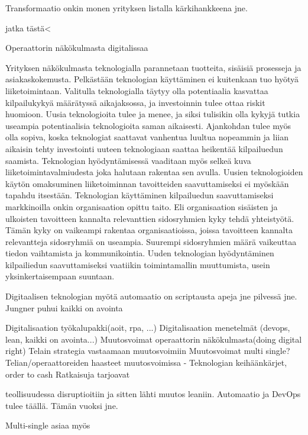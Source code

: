 \documentclass[finnish,12pt,a4paper,pdftex]{article}
\begin{document}
Transformaatio onkin monen yrityksen listalla kärkihankkeena jne.

jatka tästä<


Operaattorin näkökulmasta digitalissaa



Yrityksen näkökulmasta teknologialla parannetaan tuotteita, sisäisiä prosesseja ja asiakaskokemusta. Pelkästään teknologian käyttäminen ei kuitenkaan tuo hyötyä liiketoimintaan. Valitulla teknologialla täytyy olla potentiaalia kasvattaa kilpailukykyä määrätyssä aikajaksossa, ja investoinnin tulee ottaa riskit huomioon. Uusia teknologioita tulee ja menee, ja siksi tulisikin olla kykyjä tutkia useampia potentiaalisia teknologioita saman aikaisesti. Ajankohdan tulee myös olla sopiva, koska teknologiat saattavat vanhentua luultua nopeammin ja liian aikaisin tehty investointi uuteen teknologiaan saattaa heikentää kilpailuedun saamista. Teknologian hyödyntämisessä vaaditaan myös selkeä kuva liiketoimintavalmiudesta joka halutaan rakentaa sen avulla. Uusien teknologioiden käytön omaksuminen liiketoiminnan tavoitteiden saavuttamiseksi ei myöskään tapahdu itsestään. Teknologian käyttäminen kilpailuedun saavuttamiseksi markkinoilla onkin organisaation opittu taito. Eli organisaation sisäisten ja ulkoisten tavoitteen kannalta relevanttien sidosryhmien kyky tehdä yhteistyötä. Tämän kyky on vaikeampi rakentaa organisaatioissa, joissa tavoitteen kannalta relevantteja sidosryhmiä on useampia. Suurempi sidosryhmien määrä vaikeuttaa tiedon vaihtamista ja kommunikointia. Uuden teknologian hyödyntäminen kilpailiedun saavuttamiseksi vaatiikin toimintamallin muuttumista, usein yksinkertaisempaan suuntaan.





Digitaalisen teknologian myötä automaatio on scriptausta apeja jne pilvessä jne. Jungner puhui kaikki on avointa



Digitalisaation työkalupakki(aoit, rpa, ...)
Digitalisaation menetelmät (devops, lean, kaikki on avointa...)
Muutosvoimat operaattorin näkökulmasta(doing digital right)
Telain strategia vastaamaan muutosvoimiin
Muutosvoimat
multi single?
Telian/operaattoreiden haasteet muutosvoimissa
- Teknologian keihäänkärjet, order to cash
Ratkaisuja tarjoavat 

teollisuudessa disruptioitiin ja sitten lähti muutos leaniin.
Automaatio ja DevOps tulee täällä. Tämän vuoksi jne.

Multi-single asiaa myös
\end{document}
